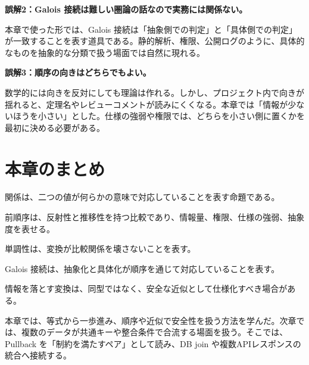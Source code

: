 \begin{warningbox}
\textbf{誤解2：Galois 接続は難しい圏論の話なので実務には関係ない。}\par
本章で使った形では、Galois 接続は「抽象側での判定」と「具体側での判定」が一致することを表す道具である。静的解析、権限、公開ログのように、具体的なものを抽象的な分類で扱う場面では自然に現れる。
\end{warningbox}

\begin{warningbox}
\textbf{誤解3：順序の向きはどちらでもよい。}\par
数学的には向きを反対にしても理論は作れる。しかし、プロジェクト内で向きが揺れると、定理名やレビューコメントが読みにくくなる。本章では「情報が少ないほうを小さい」とした。仕様の強弱や権限では、どちらを小さい側に置くかを最初に決める必要がある。
\end{warningbox}

\section{本章のまとめ}

関係は、二つの値が何らかの意味で対応していることを表す命題である。

前順序は、反射性と推移性を持つ比較であり、情報量、権限、仕様の強弱、抽象度を表せる。

単調性は、変換が比較関係を壊さないことを表す。

Galois 接続は、抽象化と具体化が順序を通じて対応していることを表す。

情報を落とす変換は、同型ではなく、安全な近似として仕様化すべき場合がある。

本章では、等式から一歩進み、順序や近似で安全性を扱う方法を学んだ。次章では、複数のデータが共通キーや整合条件で合流する場面を扱う。そこでは、Pullback を「制約を満たすペア」として読み、DB join や複数APIレスポンスの統合へ接続する。
